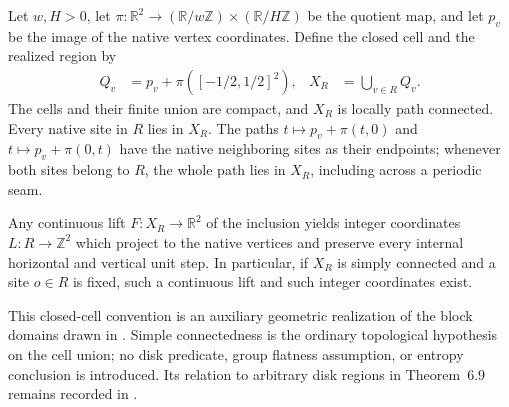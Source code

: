 \begin{lemma}%
    \label{thm:peps_torus_region_realization}
    \leanok
    Let $w,H>0$, let
    $\pi:\mathbb R^2\to(\mathbb R/w\mathbb Z)\times
        (\mathbb R/H\mathbb Z)$ be the quotient map, and let $p_v$
    be the image of the native vertex coordinates. Define the closed
    cell and the realized region by
    \begin{align}
        Q_v & =p_v+\pi([-1/2,1/2]^2), &
        X_R & =\bigcup_{v\in R}Q_v.
    \end{align}
    The cells and their finite union are compact, and $X_R$ is locally
    path connected. Every native site in $R$ lies in $X_R$. The paths
    $t\mapsto p_v+\pi(t,0)$ and $t\mapsto p_v+\pi(0,t)$ have the
    native neighboring sites as their endpoints; whenever both sites
    belong to $R$, the whole path lies in $X_R$, including across a
    periodic seam.

    Any continuous lift $F:X_R\to\mathbb R^2$ of the inclusion
    yields integer coordinates $L:R\to\mathbb Z^2$ which project to
    the native vertices and preserve every internal horizontal and
    vertical unit step. In particular, if $X_R$ is simply connected
    and a site $o\in R$ is fixed, such a continuous lift and such
    integer coordinates exist.

    This closed-cell convention is an auxiliary geometric realization
    of the block domains drawn in \cite[\S6.3]{Schuch2010PEPS}.
    Simple connectedness is the ordinary topological hypothesis on
    the cell union; no disk predicate, group flatness assumption,
    or entropy conclusion is introduced. Its relation to arbitrary
    disk regions in Theorem~6.9 remains recorded in
    \cite{gap:rmp_peps_quantum_double_g_isometry}.
\end{lemma}

